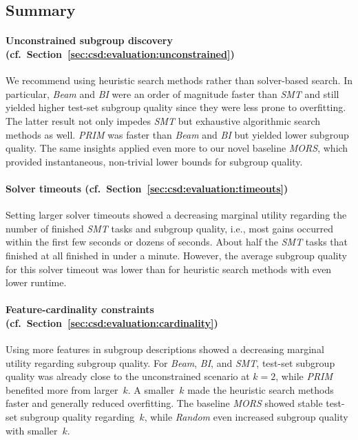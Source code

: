 \documentclass{article}
\theoremstyle{definition}
\begin{document}
\subsection{Summary}
\label{sec:csd:evaluation:summary}

\paragraph{Unconstrained subgroup discovery (cf.~Section~\ref{sec:csd:evaluation:unconstrained})}

We recommend using heuristic search methods rather than solver-based search.
In particular, \emph{Beam} and \emph{BI} were an order of magnitude faster than \emph{SMT} and still yielded higher test-set subgroup quality since they were less prone to overfitting.
The latter result not only impedes \emph{SMT} but exhaustive algorithmic search methods as well.
\emph{PRIM} was faster than \emph{Beam} and \emph{BI} but yielded lower subgroup quality.
The same insights applied even more to our novel baseline \emph{MORS}, which provided instantaneous, non-trivial lower bounds for subgroup quality.

\paragraph{Solver timeouts (cf.~Section~\ref{sec:csd:evaluation:timeouts})}

Setting larger solver timeouts showed a decreasing marginal utility regarding the number of finished \emph{SMT} tasks and subgroup quality, i.e., most gains occurred within the first few seconds or dozens of seconds.
About half the \emph{SMT} tasks that finished at all finished in under a minute.
However, the average subgroup quality for this solver timeout was lower than for heuristic search methods with even lower runtime.

\paragraph{Feature-cardinality constraints (cf.~Section~\ref{sec:csd:evaluation:cardinality})}

Using more features in subgroup descriptions showed a decreasing marginal utility regarding subgroup quality.
For \emph{Beam}, \emph{BI}, and \emph{SMT}, test-set subgroup quality was already close to the unconstrained scenario at $k=2$, while \emph{PRIM} benefited more from larger~$k$.
A smaller~$k$ made the heuristic search methods faster and generally reduced overfitting.
The baseline \emph{MORS} showed stable test-set subgroup quality regarding~$k$, while \emph{Random} even increased subgroup quality with smaller~$k$.
\end{document}
